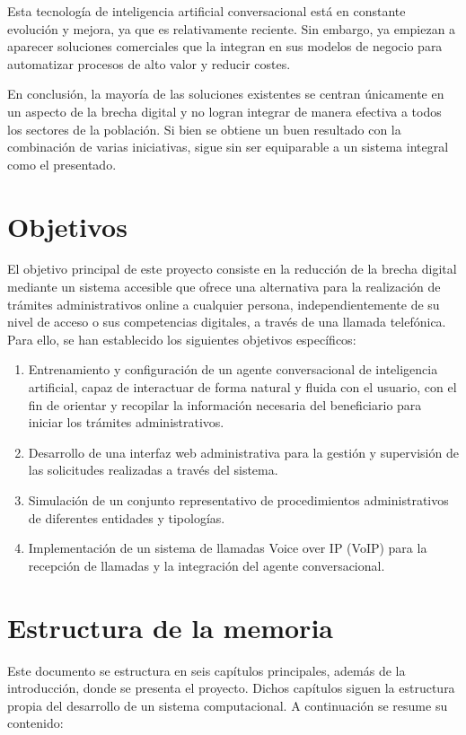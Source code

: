     Esta tecnología de inteligencia artificial conversacional está en constante evolución y mejora, ya que es relativamente reciente. Sin embargo, ya empiezan a aparecer soluciones comerciales que la integran en sus modelos de negocio para automatizar procesos de alto valor y reducir costes.

    En conclusión, la mayoría de las soluciones existentes se centran únicamente en un aspecto de la brecha digital y no logran integrar de manera efectiva a todos los sectores de la población. 
    Si bien se obtiene un buen resultado con la combinación de varias iniciativas, sigue sin ser equiparable a un sistema integral como el presentado.

\section{Objetivos}
    El objetivo principal de este proyecto consiste en la reducción de la brecha digital mediante un sistema accesible que ofrece una alternativa para la realización de trámites administrativos online a cualquier persona, independientemente de su nivel de acceso o sus competencias digitales, a través de una llamada telefónica.
    Para ello, se han establecido los siguientes objetivos específicos:
    \begin{enumerate}
        \item Entrenamiento y configuración de un agente conversacional de inteligencia artificial, capaz de interactuar de forma natural y fluida con el usuario, con el fin de orientar y recopilar la información necesaria del beneficiario para iniciar los trámites administrativos.
        \item Desarrollo de una interfaz web administrativa para la gestión y supervisión de las solicitudes realizadas a través del sistema.
        \item Simulación de un conjunto representativo de procedimientos administrativos de diferentes entidades y tipologías.
        \item Implementación de un sistema de llamadas Voice over IP (VoIP) para la recepción de llamadas y la integración del agente conversacional.
    \end{enumerate}

\section{Estructura de la memoria}
    Este documento se estructura en seis capítulos principales, además de la introducción, donde se presenta el proyecto.
    Dichos capítulos siguen la estructura propia del desarrollo de un sistema computacional. A continuación se resume su contenido:
    
